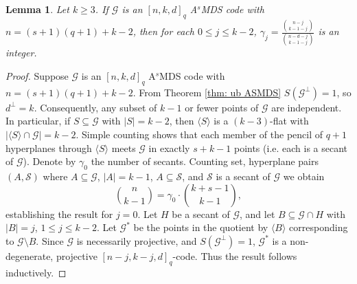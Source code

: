 \documentclass[11pt,a4paper]{amsart}
\newcommand{\AS}{ A$^s$MDS }
\newcommand{\G}{\mathcal{G}}
\theoremstyle{plain}
\newtheorem{lemma}[theorem]{Lemma}
\theoremstyle{definition}
\theoremstyle{remark}
\begin{document}
	\begin{lemma}\label{lem: full length comb}
		Let $k\ge 3$. If $\G$ is an $[n,k,d]_q$ \AS code with $n=(s+1)(q+1)+k-2$, then for each $0\le j\le k-2$,    $\gamma_j = \frac{{n-j\choose k-1-j}}{{n-d-j \choose k-1-j}}$ is an integer.
	\end{lemma}
	\begin{proof}
		Suppose $\G$ is an $[n,k,d]_q$ \AS code with $n= (s+1)(q+1)+k-2$. From Theorem \ref{thm: ub ASMDS} $S(\G^\perp)=1$, so $d^\perp=k$. Consequently, any subset of $k-1$ or fewer points of $\G$ are independent. In particular, if $S \subseteq \G$ with $|S|=k-2$,  then $\langle S \rangle$ is a $(k-3)$-flat with $|\langle S \rangle \cap \G| = k-2$.  Simple counting shows that each member of the pencil of $q+1$ hyperplanes through $\langle S \rangle$  meets $\G$ in exactly $s+k-1$ points (i.e. each is a secant of $\G$). Denote by $\gamma_0$ the number of secants. Counting  set, hyperplane pairs $(A,\mathcal{S})$ where $A\subseteq \G$, $|A|=k-1$, $A \subseteq \mathcal{S}$, and $\mathcal{S}$ is a secant of $\G$ we obtain
		\begin{equation}
			{n\choose k-1} = \gamma_0 \cdot {k+s-1 \choose k-1},
		\end{equation}
		establishing the result for $j=0$.  Let $H$ be a secant of $\G$, and let  $B\subseteq \G\cap H$ with $|B|=j$, $1\le j\le k-2$. Let $\G^*$ be the points in the  quotient by $\langle B \rangle$ corresponding to $\G\setminus B$. Since $\G$ is necessarily projective, and $S(\G^\perp) = 1$, $\G^*$ is a non-degenerate, projective $[n-j, k-j,d]_q$-code. Thus the result follows inductively.
	\end{proof}
\end{document}
